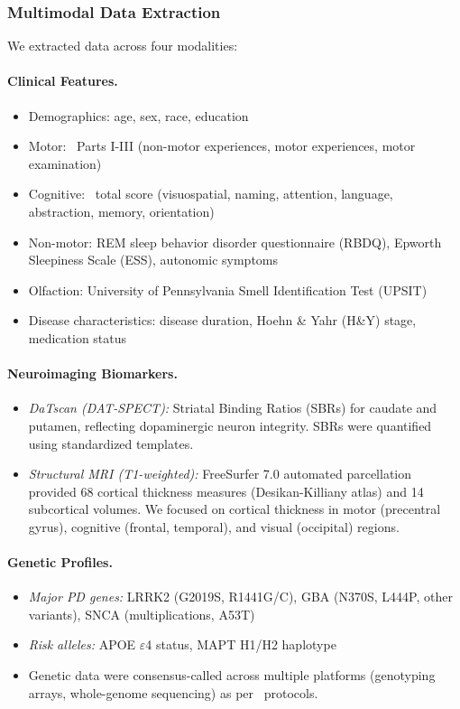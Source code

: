 \subsubsection{Multimodal Data Extraction}

We extracted data across four modalities:

\paragraph{Clinical Features.} 
\begin{itemize}
    \item Demographics: age, sex, race, education
    \item Motor: \updrs\ Parts I-III (non-motor experiences, motor experiences, motor examination)
    \item Cognitive: \moca\ total score (visuospatial, naming, attention, language, abstraction, memory, orientation)
    \item Non-motor: REM sleep behavior disorder questionnaire (RBDQ), Epworth Sleepiness Scale (ESS), autonomic symptoms
    \item Olfaction: University of Pennsylvania Smell Identification Test (UPSIT)
    \item Disease characteristics: disease duration, Hoehn \& Yahr (H\&Y) stage, medication status
\end{itemize}

\paragraph{Neuroimaging Biomarkers.}
\begin{itemize}
    \item \textit{DaTscan (DAT-SPECT):} Striatal Binding Ratios (SBRs) for caudate and putamen, reflecting dopaminergic neuron integrity. SBRs were quantified using standardized templates\cite{marek2018parkinson}.
    \item \textit{Structural MRI (T1-weighted):} FreeSurfer 7.0\cite{fischl2012freesurfer} automated parcellation provided 68 cortical thickness measures (Desikan-Killiany atlas) and 14 subcortical volumes. We focused on cortical thickness in motor (precentral gyrus), cognitive (frontal, temporal), and visual (occipital) regions.
\end{itemize}

\paragraph{Genetic Profiles.}
\begin{itemize}
    \item \textit{Major PD genes:} LRRK2 (G2019S, R1441G/C), GBA (N370S, L444P, other variants), SNCA (multiplications, A53T)
    \item \textit{Risk alleles:} APOE $\varepsilon$4 status, MAPT H1/H2 haplotype
    \item Genetic data were consensus-called across multiple platforms (genotyping arrays, whole-genome sequencing) as per \ppmi\ protocols\cite{blauwendraat2020genetic}.
\end{itemize}

